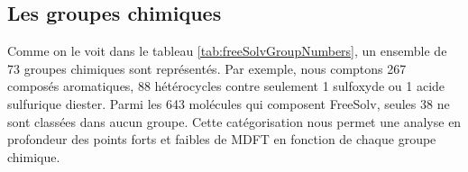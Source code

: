 \subsection{Les groupes chimiques}
Comme on le voit dans le tableau \ref{tab:freeSolvGroupNumbers}, un ensemble de 73 groupes chimiques sont représentés. Par exemple, nous comptons 267 composés aromatiques, 88 hétérocycles contre seulement 1 sulfoxyde ou 1 acide sulfurique diester. Parmi les 643 molécules qui composent FreeSolv, seules 38 ne sont classées dans aucun groupe. Cette catégorisation nous permet une analyse en profondeur des points forts et faibles de MDFT en fonction de chaque groupe chimique.










